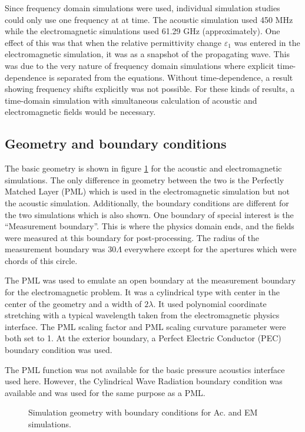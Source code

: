 \documentclass[11pt,twoside]{eitExjobb}
\begin{document}
	Since frequency domain simulations were used, individual simulation studies could only use one frequency at at time. The acoustic simulation used 450 MHz while the electromagnetic simulations used 61.29 GHz (approximately). One effect of this was that when the relative permittivity change $\varepsilon_1$ was entered in the electromagnetic simulation, it was as a snapshot of the propagating wave. This was due to the very nature of frequency domain simulations where explicit time-dependence is separated from the equations. Without time-dependence, a result showing frequency shifts explicitly was not possible. For these kinds of results, a time-domain simulation with simultaneous calculation of acoustic and electromagnetic fields would be necessary.
	
	\subsection{Geometry and boundary conditions}
	The basic geometry is shown in figure \ref{fig:sim-geometry} for the acoustic and electromagnetic simulations. The only difference in geometry between the two is the Perfectly Matched Layer (PML) which is used in the electromagnetic simulation but not the acoustic simulation. Additionally, the boundary conditions are different for the two simulations which is also shown. One boundary of special interest is the ``Measurement boundary''. This is where the physics domain ends, and the fields were measured at this boundary for post-processing. The radius of the measurement boundary was $30\Lambda$ everywhere except for the apertures which were chords of this circle.
	
	The PML was used to emulate an open boundary at the measurement boundary for the electromagnetic problem. It was a cylindrical type with center in the center of the geometry and a width of $2\lambda$. It used polynomial coordinate stretching with a typical wavelength taken from the electromagnetic physics interface. The PML scaling factor and PML scaling curvature parameter were both set to 1. At the exterior boundary, a Perfect Electric Conductor (PEC) boundary condition was used.
	
	The PML function was not available for the basic pressure acoustics interface used here. However, the Cylindrical Wave Radiation boundary condition was available and was used for the same purpose as a PML.
	
	\begin{figure}
		\centering
		
		\vspace{5 mm}
		
		
		\caption{\label{fig:sim-geometry} Simulation geometry with boundary conditions for Ac. and EM simulations.}
	\end{figure}
	
\end{document}
